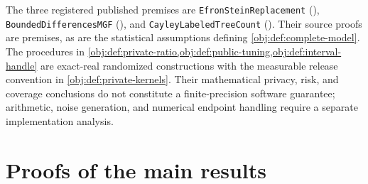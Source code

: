 \documentclass[11pt]{article}
\begin{document}
The three registered published premises are \texttt{EfronSteinReplacement} (\citet[Theorem 3.1, replacement-copy form, p.~54]{BoucheronLugosiMassart2013}), \texttt{BoundedDifferencesMGF} (\citet[Theorem 6.2, displayed log-mgf conclusion in its proof, p.~167]{BoucheronLugosiMassart2013}), and \texttt{CayleyLabeledTreeCount} (\citet[Section 5.6, Theorem 5.40]{KellerTrotterAppliedCombinatorics}). Their source proofs are premises, as are the statistical assumptions defining \cref{obj:def:complete-model}. The procedures in \cref{obj:def:private-ratio,obj:def:public-tuning,obj:def:interval-handle} are exact-real randomized constructions with the measurable release convention in \cref{obj:def:private-kernels}. Their mathematical privacy, risk, and coverage conclusions do not constitute a finite-precision software guarantee; arithmetic, noise generation, and numerical endpoint handling require a separate implementation analysis.


\section{Proofs of the main results}\label{sec:deferred-proofs}
\end{document}

